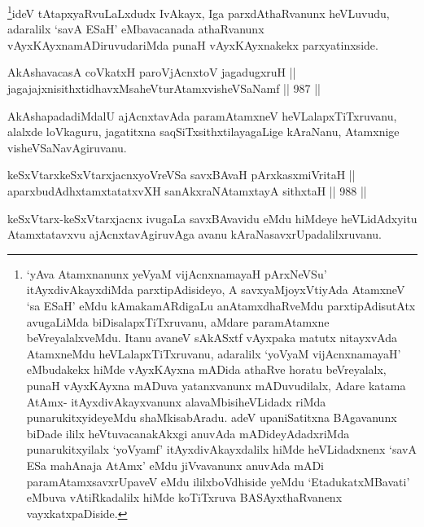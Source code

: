 \begin{artha}
\footnote{`yAva Atamxnanunx yeVyaM vijAcnxnamayaH pArxNeVSu' itAyxdivAkayxdiMda parxtipAdisideyo, A savxyaMjoyxVtiyAda AtamxneV `sa ESaH' eMdu kAmakamARdigaLu anAtamxdhaRveMdu parxtipAdisutAtx avugaLiMda biDisalapxTiTxruvanu, aMdare paramAtamxne beVreyalalxveMdu. Itanu avaneV sAkASxtf vAyxpaka matutx nitayxvAda AtamxneMdu heVLalapxTiTxruvanu, adaralilx `yoV\s yaM vijAcnxnamayaH' eMbudakekx hiMde vAyxKAyxna mADida athaRve horatu beVreyalalx, punaH vAyxKAyxna mADuva yatanxvanunx mADuvudilalx, Adare katama AtAmx- itAyxdivAkayxvanunx alavaMbisiheVLidadx riMda punarukitxyideyeMdu shaMkisabAradu. adeV upaniSatitxna BAgavanunx biDade ililx heVtuvacanakAkxgi anuvAda mADideyAdadxriMda punarukitxyilalx `yoV\s yamf' itAyxdivAkayxdalilx hiMde heVLidadxnenx `savA ESa mahAnaja AtAmx' eMdu jiVvavanunx anuvAda mADi paramAtamxsavxrUpaveV eMdu ililxboVdhiside yeMdu `EtadukatxMBavati' eMbuva vAtiRkadalilx hiMde koTiTxruva BASAyxthaRvanenx vayxkatxpaDiside.}ideV tAtapxyaRvuLaLxdudx IvAkayx, Iga parxdAthaRvanunx heVLuvudu, adaralilx `savA ESaH' eMbavacanada athaRvanunx vAyxKAyxnamADiruvudariMda punaH vAyxKAyxnakekx parxyatinxside.
\end{artha}


\begin{shl}
AkAshavacasA coVkatxH paroV\s jAcnxtoV jagadugxruH || \\
jagajajxnisithxtidhavxMsaheVturAtamxvisheVSaNamf \hfill || 987 ||  
\end{shl}

\begin{artha}
AkAshapadadiMdalU ajAcnxtavAda paramAtamxneV heVLalapxTiTxruvanu, alalxde loVkaguru, jagatitxna saqSiTxsithxtilayagaLige kAraNanu, Atamxnige visheVSaNavAgiruvanu.
\end{artha}

\begin{shl}
keSxVtarxkeSxVtarxjacnxyoVreVSa savxBAvaH pArxkasxmiVritaH || \\
aparxbudAdhxtamxtatatxvXH sanAkxraNAtamxtayA sithxtaH \hfill || 988 ||  
\end{shl}

\begin{artha}
keSxVtarx-keSxVtarxjacnx ivugaLa savxBAvavidu eMdu hiMdeye heVLidAdxyitu Atamxtatavxvu ajAcnxtavAgiruvAga avanu kAraNasavxrUpadalilxruvanu.
\end{artha}

